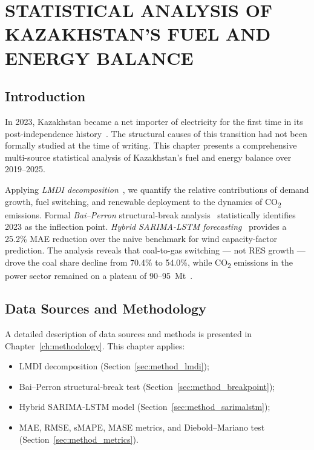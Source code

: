 
\chapter{STATISTICAL ANALYSIS OF KAZAKHSTAN'S FUEL AND ENERGY BALANCE}
\label{ch:energy_balance}

\section{Introduction}
\label{sec:eb_intro}

In 2023, Kazakhstan became a net importer of electricity for the first time in its post-independence history~\cite{kegoc2024, statgov2024}. The structural causes of this transition had not been formally studied at the time of writing. This chapter presents a comprehensive multi-source statistical analysis of Kazakhstan's fuel and energy balance over 2019--2025.

Applying \emph{LMDI decomposition}~\cite{ang2005, ang2015}, we quantify the relative contributions of demand growth, fuel switching, and renewable deployment to the dynamics of CO\textsubscript{2} emissions. Formal \emph{Bai--Perron} structural-break analysis~\cite{baiperron1998, baiperron2003} statistically identifies 2023 as the inflection point. \emph{Hybrid SARIMA-LSTM forecasting}~\cite{hewamalage2021, hochreiter1997} provides a 25.2\% MAE reduction over the naive benchmark for wind capacity-factor prediction. The analysis reveals that coal-to-gas switching --- not RES growth --- drove the coal share decline from 70.4\% to 54.0\%, while CO\textsubscript{2} emissions in the power sector remained on a plateau of 90--95~Mt~\cite{ember2024, owid2024}.

\section{Data Sources and Methodology}
\label{sec:eb_methodology}

A detailed description of data sources and methods is presented in Chapter~\ref{ch:methodology}. This chapter applies:
\begin{itemize}
    \item LMDI decomposition (Section~\ref{sec:method_lmdi});
    \item Bai--Perron structural-break test (Section~\ref{sec:method_breakpoint});
    \item Hybrid SARIMA-LSTM model (Section~\ref{sec:method_sarimalstm});
    \item MAE, RMSE, sMAPE, MASE metrics, and Diebold--Mariano test (Section~\ref{sec:method_metrics}).
\end{itemize}

